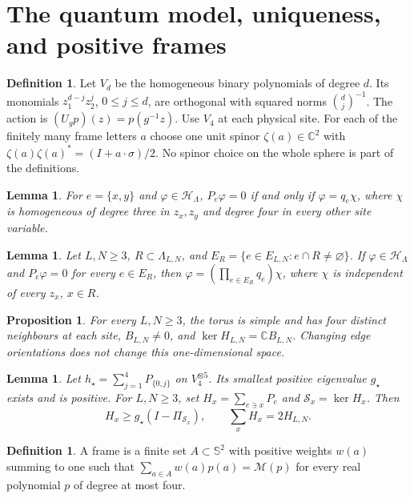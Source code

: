 \documentclass[11pt,reqno]{amsart}
\newtheorem{lemma}[theorem]{Lemma}
\newtheorem{proposition}[theorem]{Proposition}
\theoremstyle{definition}
\newtheorem{definition}[theorem]{Definition}
\theoremstyle{remark}
\begin{document}
\section{The quantum model, uniqueness, and positive frames}

\begin{definition}\label{d:poly}
Let \(V_d\) be the homogeneous binary polynomials of degree \(d\).
Its monomials \(z_1^{d-j}z_2^j\), \(0\le j\le d\), are orthogonal with
squared norms \(\binom dj^{-1}\). The action is
\((U_gp)(z)=p(g^{-1}z)\). Use \(V_4\) at each physical site.
For each of the finitely many frame letters \(a\) choose one unit
spinor \(\zeta(a)\in\mathbb C^2\) with
\(\zeta(a)\zeta(a)^*=(I+a\cdot\sigma)/2\).
No spinor choice on the whole sphere is part of the definitions.
\end{definition}

\begin{lemma}\label{l:edge}
For \(e=\{x,y\}\) and \(\varphi\in\mathcal H_\Lambda\),
\(P_e\varphi=0\) if and only if
\(\varphi=q_e\chi\), where \(\chi\) is homogeneous of degree three
in \(z_x,z_y\) and degree four in every other site variable.
\end{lemma}

\begin{lemma}\label{l:divisibility}
Let \(L,N\ge3\), \(R\subset\Lambda_{L,N}\), and
\(E_R=\{e\in E_{L,N}:e\cap R\ne\varnothing\}\).
If \(\varphi\in\mathcal H_\Lambda\) and \(P_e\varphi=0\)
for every \(e\in E_R\), then
\(\varphi=(\prod_{e\in E_R}q_e)\chi\), where \(\chi\) is independent
of every \(z_x\), \(x\in R\).
\end{lemma}

\begin{proposition}\label{p:toruskernel}
For every \(L,N\ge3\), the torus is simple and has four distinct
neighbours at each site, \(B_{L,N}\ne0\), and
\(\ker H_{L,N}=\mathbb C B_{L,N}\).
Changing edge orientations does not change this one-dimensional space.
\end{proposition}

\begin{lemma}\label{l:star}
Let \(h_\star=\sum_{j=1}^4P_{\{0,j\}}\) on \(V_4^{\otimes5}\).
Its smallest positive eigenvalue \(g_\star\) exists and is positive.
For \(L,N\ge3\), set \(H_x=\sum_{e\ni x}P_e\) and
\(\mathcal S_x=\ker H_x\). Then
\[
 H_x\ge g_\star(I-\Pi_{\mathcal S_x}),\qquad
 \sum_xH_x=2H_{L,N}.
\]
\end{lemma}

\begin{definition}\label{d:frame}
A frame is a finite set \(A\subset\mathbb S^2\) with positive weights
\(w(a)\) summing to one such that
\(\sum_{a\in A}w(a)p(a)=\mathcal M(p)\)
for every real polynomial \(p\) of degree at most four.
\end{definition}
\end{document}
